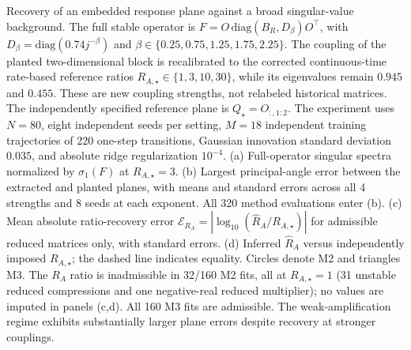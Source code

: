 \caption{Recovery of an embedded response plane against a broad singular-value background.
The full stable operator is $F=O\,\mathrm{diag}(B_R,D_\beta)O^\top$,
with $D_\beta=\mathrm{diag}(0.74 j^{-\beta})$ and
$\beta\in\{0.25,0.75,1.25,1.75,2.25\}$.
The coupling of the planted two-dimensional block is recalibrated to the corrected
continuous-time rate-based reference ratios
$R_{A,\star}\in\{1,3,10,30\}$, while its eigenvalues remain
$0.945$ and $0.455$. These are new coupling strengths, not relabeled historical
matrices. The independently specified reference plane is $Q_\star=O_{:,1:2}$.
The experiment uses $N=80$, eight independent seeds per setting, $M=18$ independent
training trajectories of 220 one-step transitions, Gaussian innovation standard
deviation $0.035$, and absolute ridge regularization $10^{-4}$.
(a) Full-operator singular spectra normalized by $\sigma_1(F)$ at
$R_{A,\star}=3$. (b) Largest principal-angle error between the extracted and
planted planes, with means and standard errors across all 4 strengths and 8
seeds at each exponent. All 320 method evaluations enter (b).
(c) Mean absolute ratio-recovery error
$\mathcal{E}_{R_A}=\left|\log_{10}(\widehat R_A/R_{A,\star})\right|$
for admissible reduced matrices only, with standard errors.
(d) Inferred $\widehat R_A$ versus independently imposed $R_{A,\star}$;
the dashed line indicates equality. Circles denote M2 and triangles M3.
The $R_A$ ratio is inadmissible in 32/160 M2 fits, all at
$R_{A,\star}=1$ (31 unstable reduced compressions and one negative-real
reduced multiplier); no values are imputed in panels (c,d).
All 160 M3 fits are admissible. The weak-amplification regime exhibits
substantially larger plane errors despite recovery at stronger couplings.}
